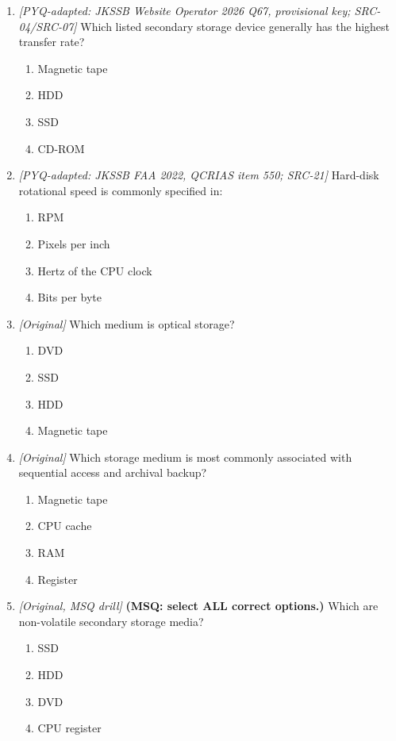 \begin{enumerate}[label=\textbf{Q\arabic*.}, leftmargin=*]
\begin{enumerate}[label=\Alph*.]
  \end{enumerate}
\item \textit{[PYQ-adapted: JKSSB Website Operator 2026 Q67, provisional key; SRC-04/SRC-07]} Which listed secondary storage device generally has the highest transfer rate?
  \begin{enumerate}[label=\Alph*.]
\item Magnetic tape
   \item HDD
   \item SSD
   \item CD-ROM
  \end{enumerate}

\item \textit{[PYQ-adapted: JKSSB FAA 2022, QCRIAS item 550; SRC-21]} Hard-disk rotational speed is commonly specified in:
  \begin{enumerate}[label=\Alph*.]
\item RPM
   \item Pixels per inch
   \item Hertz of the CPU clock
   \item Bits per byte
  \end{enumerate}

\item \textit{[Original]} Which medium is optical storage?
  \begin{enumerate}[label=\Alph*.]
\item DVD
   \item SSD
   \item HDD
   \item Magnetic tape
  \end{enumerate}

\item \textit{[Original]} Which storage medium is most commonly associated with sequential access and archival backup?
  \begin{enumerate}[label=\Alph*.]
\item Magnetic tape
   \item CPU cache
   \item RAM
   \item Register
  \end{enumerate}

\item \textit{[Original, MSQ drill]} \textbf{(MSQ: select ALL correct options.)} Which are non-volatile secondary storage media?
  \begin{enumerate}[label=\Alph*.]
\item SSD
   \item HDD
   \item DVD
   \item CPU register
  \end{enumerate}

\end{enumerate}
